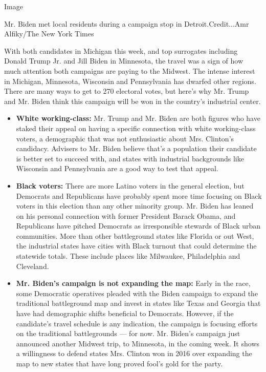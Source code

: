 Image

Mr. Biden met local residents during a campaign stop in
Detroit.Credit...Amr Alfiky/The New York Times

With both candidates in Michigan this week, and top surrogates including
Donald Trump Jr. and Jill Biden in Minnesota, the travel was a sign of
how much attention both campaigns are paying to the Midwest. The intense
interest in Michigan, Minnesota, Wisconsin and Pennsylvania has dwarfed
other regions. There are many ways to get to 270 electoral votes, but
here's why Mr. Trump and Mr. Biden think this campaign will be won in
the country's industrial center.

\begin{itemize}
\item
  \textbf{White working-class:} Mr. Trump and Mr. Biden are both figures
  who have staked their appeal on having a specific connection with
  white working-class voters, a demographic that was not enthusiastic
  about Mrs. Clinton's candidacy. Advisers to Mr. Biden believe that's a
  population their candidate is better set to succeed with, and states
  with industrial backgrounds like Wisconsin and Pennsylvania are a good
  way to test that appeal.
\item
  \textbf{Black voters:} There are more Latino voters in the general
  election, but Democrats and Republicans have probably spent more time
  focusing on Black voters in this election than any other minority
  group. Mr. Biden has leaned on his personal connection with former
  President Barack Obama, and Republicans have pitched Democrats as
  irresponsible stewards of Black urban communities. More than other
  battleground states like Florida or out West, the industrial states
  have cities with Black turnout that could determine the statewide
  totals. These include places like Milwaukee, Philadelphia and
  Cleveland.
\item
  \textbf{Mr. Biden's campaign is not expanding the map:} Early in the
  race, some Democratic operatives pleaded with the Biden campaign to
  expand the traditional battleground map and invest in states like
  Texas and Georgia that have had demographic shifts beneficial to
  Democrats. However, if the candidate's travel schedule is any
  indication, the campaign is focusing efforts on the traditional
  battlegrounds --- for now. Mr. Biden's campaign just announced another
  Midwest trip, to Minnesota, in the coming week. It shows a willingness
  to defend states Mrs. Clinton won in 2016 over expanding the map to
  new states that have long proved fool's gold for the party.
\end{itemize}

